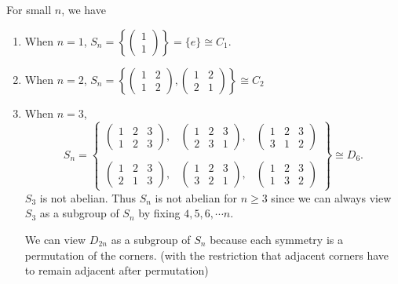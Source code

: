 \documentclass[a4paper]{article}
\begin{document}
\begin{eg}
  For small $n$, we have
  \begin{enumerate}
    \item When $n = 1$, $S_n = \left\{\begin{pmatrix}1\\1\end{pmatrix}\right\} = \{e\}\cong C_1$.
    \item When $n = 2$, $S_n = \left\{\begin{pmatrix}1 & 2\\ 1 & 2\end{pmatrix}, \begin{pmatrix}1 & 2\\2 & 1\end{pmatrix}\right\}\cong C_2$
    \item When $n = 3$,
      \[
        S_n = \left\{\begin{matrix}\begin{pmatrix}1 & 2 & 3\\1 & 2 & 3\end{pmatrix}, &\begin{pmatrix}1 & 2 & 3\\ 2 & 3 & 1\end{pmatrix}, &\begin{pmatrix}1 & 2 & 3\\3 & 1 & 2\end{pmatrix}\\\\\begin{pmatrix}1 & 2 & 3\\2 & 1 & 3\end{pmatrix}, &\begin{pmatrix}1 & 2 & 3\\ 3 & 2 & 1\end{pmatrix}, &\begin{pmatrix}1 & 2 & 3\\1 & 3 & 2\end{pmatrix}\end{matrix}\right\}\cong D_6.
      \]
      \note $S_3$ is not abelian. Thus $S_n$ is not abelian for $n \geq 3$ since we can always view $S_3$ as a subgroup of $S_n$ by fixing $4, 5, 6, \cdots n$.

      \note We can view $D_{2n}$ as a subgroup of $S_n$ because each symmetry is a permutation of the corners. (with the restriction that adjacent corners have to remain adjacent after permutation)
  \end{enumerate}
\end{eg}
\end{document}
